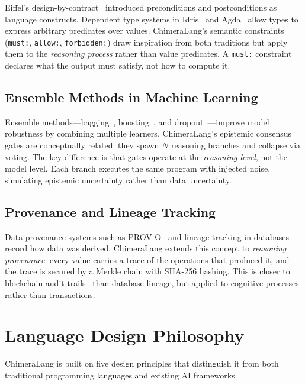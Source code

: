 \documentclass[11pt,a4paper]{article}
\begin{document}
Eiffel's design-by-contract~\cite{meyer1992applying} introduced
preconditions and postconditions as language constructs. Dependent type systems
in Idris~\cite{brady2013idris} and Agda~\cite{norell2008dependently} allow
types to express arbitrary predicates over values. ChimeraLang's semantic
constraints (\texttt{must:}, \texttt{allow:}, \texttt{forbidden:}) draw
inspiration from both traditions but apply them to the \emph{reasoning process}
rather than value predicates. A \texttt{must:} constraint declares what the
output must satisfy, not how to compute it.

\subsection{Ensemble Methods in Machine Learning}

Ensemble methods---bagging~\cite{breiman1996bagging},
boosting~\cite{freund1997decision}, and
dropout~\cite{srivastava2014dropout}---improve model robustness by combining
multiple learners. ChimeraLang's epistemic consensus gates are conceptually
related: they spawn $N$ reasoning branches and collapse via voting. The key
difference is that gates operate at the \emph{reasoning level}, not the model
level. Each branch executes the same program with injected noise, simulating
epistemic uncertainty rather than data uncertainty.

\subsection{Provenance and Lineage Tracking}

Data provenance systems such as PROV-O~\cite{lebo2013prov} and
lineage tracking in databases~\cite{buneman2001and} record how data
was derived. ChimeraLang extends this concept to \emph{reasoning provenance}:
every value carries a trace of the operations that produced it, and the trace is
secured by a Merkle chain with SHA-256 hashing. This is closer to blockchain
audit trails~\cite{nakamoto2008bitcoin} than database lineage, but applied to
cognitive processes rather than transactions.

\section{Language Design Philosophy}
\label{sec:design}

ChimeraLang is built on five design principles that distinguish it from
both traditional programming languages and existing AI frameworks.
\end{document}
